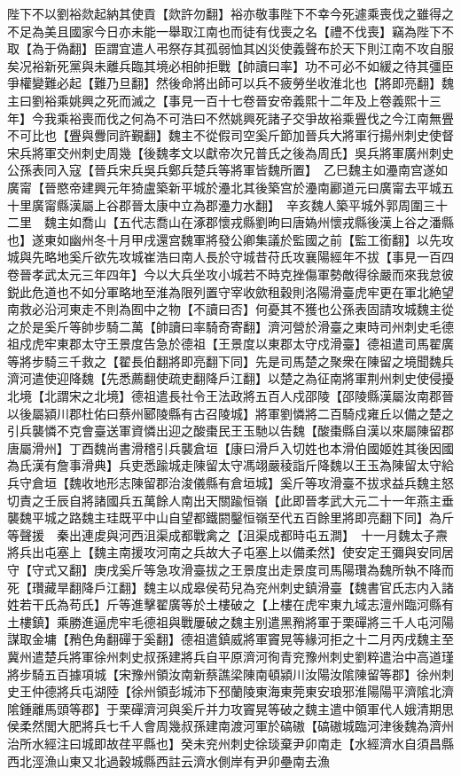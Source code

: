 陛下不以劉裕欻起納其使貢【欻許勿翻】裕亦敬事陛下不幸今死遽乘喪伐之雖得之不足為美且國家今日亦未能一舉取江南也而徒有伐喪之名【禮不伐喪】竊為陛下不取【為于偽翻】臣謂宜遣人弔祭存其孤弱恤其凶災使義聲布於天下則江南不攻自服矣况裕新死黨與未離兵臨其境必相帥拒戰【帥讀曰率】功不可必不如緩之待其彊臣爭權變難必起【難乃旦翻】然後命將出師可以兵不疲勞坐收淮北也【將即亮翻】魏主曰劉裕乘姚興之死而滅之【事見一百十七卷晉安帝義熙十二年及上卷義熙十三年】今我乘裕喪而伐之何為不可浩曰不然姚興死諸子交爭故裕乘舋伐之今江南無舋不可比也【舋與釁同許覲翻】魏主不從假司空奚斤節加晉兵大將軍行揚州刺史使督宋兵將軍交州刺史周幾【後魏孝文以獻帝次兄普氏之後為周氏】吳兵將軍廣州刺史公孫表同入寇【晉兵宋兵吳兵鄭兵楚兵等將軍皆魏所置】　乙巳魏主如灅南宫遂如廣甯【晉愍帝建興元年猗盧築新平城於灅北其後築宫於灅南酈道元曰廣甯去平城五十里廣甯縣漢屬上谷郡晉太康中立為郡灅力水翻】　辛亥魏人築平城外郭周圍三十二里　魏主如喬山【五代志喬山在涿郡懷戎縣劉昫曰唐媯州懷戎縣後漢上谷之潘縣也】遂東如幽州冬十月甲戌還宫魏軍將發公卿集議於監國之前【監工銜翻】以先攻城與先略地奚斤欲先攻城崔浩曰南人長於守城昔苻氏攻襄陽經年不拔【事見一百四卷晉孝武太元三年四年】今以大兵坐攻小城若不時克挫傷軍勢敵得徐嚴而來我怠彼鋭此危道也不如分軍略地至淮為限列置守宰收歛租穀則洛陽滑臺虎牢更在軍北絶望南救必沿河東走不則為囿中之物【不讀曰否】何憂其不獲也公孫表固請攻城魏主從之於是奚斤等帥步騎二萬【帥讀曰率騎奇寄翻】濟河營於滑臺之東時司州刺史毛德祖戍虎牢東郡太守王景度告急於德祖【王景度以東郡太守戍滑臺】德祖遣司馬翟廣等將步騎三千救之【翟長伯翻將即亮翻下同】先是司馬楚之聚衆在陳留之境聞魏兵濟河遣使迎降魏【先悉薦翻使疏吏翻降戶江翻】以楚之為征南將軍荆州刺史使侵擾北境【北謂宋之北境】德祖遣長社令王法政將五百人戍邵陵【邵陵縣漢屬汝南郡晉以後屬潁川郡杜佑曰蔡州郾陵縣有古召陵城】將軍劉憐將二百騎戍雍丘以備之楚之引兵襲憐不克會臺送軍資憐出迎之酸棗民王玉馳以告魏【酸棗縣自漢以來屬陳留郡唐屬滑州】丁酉魏尚書滑稽引兵襲倉垣【康曰滑戶入切姓也本滑伯國姬姓其後因國為氏漢有詹事滑典】兵吏悉踰城走陳留太守馮翊嚴稜詣斤降魏以王玉為陳留太守給兵守倉垣【魏收地形志陳留郡治浚儀縣有倉垣城】奚斤等攻滑臺不拔求益兵魏主怒切責之壬辰自將諸國兵五萬餘人南出天關踰恒嶺【此即晉孝武大元二十一年燕主垂襲魏平城之路魏主珪既平中山自望都鐵閼鑿恒嶺至代五百餘里將即亮翻下同】為斤等聲援　秦出連䖍與河西沮渠成都戰禽之【沮渠成都時屯五澗】　十一月魏太子燾將兵出屯塞上【魏主南援攻河南之兵故大子屯塞上以備柔然】使安定王彌與安同居守【守式又翻】庚戌奚斤等急攻滑臺拔之王景度出走景度司馬陽瓚為魏所執不降而死【瓚藏旱翻降戶江翻】魏主以成皋侯苟兒為兖州刺史鎮滑臺【魏書官氏志内入諸姓若干氏為苟氏】斤等進擊翟廣等於土樓破之【上樓在虎牢東九域志澶州臨河縣有土樓鎮】乘勝進逼虎牢毛德祖與戰屢破之魏主别遣黑矟將軍于栗磾將三千人屯河陽謀取金墉【矟色角翻磾于奚翻】德祖遣鎮威將軍竇晃等緣河拒之十二月丙戌魏主至冀州遣楚兵將軍徐州刺史叔孫建將兵自平原濟河徇青兖豫州刺史劉粹遣治中高道瑾將步騎五百據項城【宋豫州領汝南新蔡譙梁陳南頓潁川汝陽汝隂陳留等郡】徐州刺史王仲德將兵屯湖陸【徐州領彭城沛下邳蘭陵東海東莞東安琅邪淮陽陽平濟隂北濟隂鍾離馬頭等郡】于栗磾濟河與奚斤并力攻竇晃等破之魏主遣中領軍代人娥清期思侯柔然閭大肥將兵七千人會周幾叔孫建南渡河軍於碻磝【碻磝城臨河津後魏為濟州治所水經注曰城即故荏平縣也】癸未兖州刺史徐琰棄尹卯南走【水經濟水自須昌縣西北涇漁山東又北過穀城縣西註云濟水側岸有尹卯壘南去漁